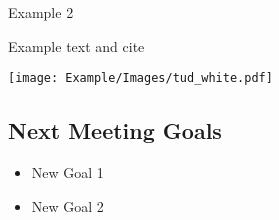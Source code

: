 \begin{frame}{Example 2}
	\begin{minipage}{0.5\textwidth}
		Example text and cite \cite{Bessa2017a}
	\end{minipage}%
	\colorbox{red!20}{\begin{minipage}{0.5\textwidth}
			\texttt{[image: Example/Images/tud\_white.pdf]}   
	\end{minipage}}
\end{frame}



\subsection{Next Meeting Goals}
\begin{frame}{}
\centering
\begin{minipage}{0.6\textwidth}
		\begin{itemize}
        \centering
			\item New Goal 1
			\item New Goal 2
		\end{itemize}
	\end{minipage}
\end{frame}